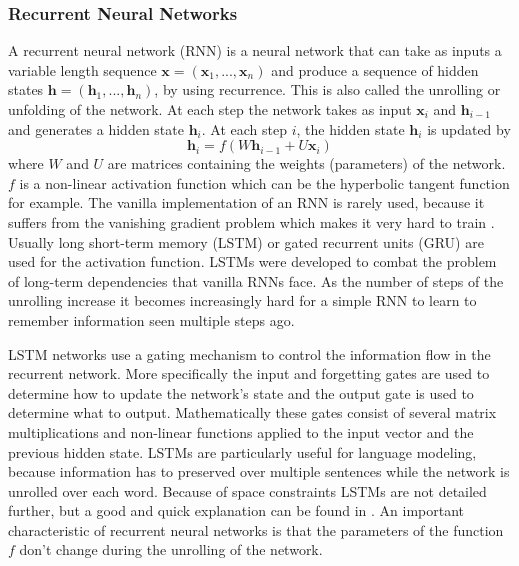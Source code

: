 \documentclass[12pt]{article}
\begin{document}
\subsubsection{Recurrent Neural Networks} \label{sssec:231}
A recurrent neural network (RNN) \cite{RNN:1988} is a neural network that can take as inputs a variable length sequence \(\bm{x}=(\bm{x}_1,...,\bm{x}_n)\) and produce a sequence of hidden states \(\bm{h}=(\bm{h}_1,...,\bm{h}_n)\), by using recurrence. This is also called the unrolling or unfolding of the network. At each step the network takes as input \(\bm{x}_i\) and \(\bm{h}_{i-1}\) and generates a hidden state \(\bm{h}_i\). At each step \(i\), the hidden state \(\bm{h}_i\) is updated by
\begin{equation} \label{eq231a}
\bm{h}_i=f(W\bm{h}_{i-1}+U\bm{x}_i)
\end{equation}
where \(W\) and \(U\) are matrices containing the weights (parameters) of the network. \(f\) is a non-linear activation function which can be the hyperbolic tangent function for example. The vanilla implementation of an RNN is rarely used, because it suffers from the vanishing gradient problem which makes it very hard to train \cite{Hochreiter:1998}. Usually long short-term memory (LSTM) \cite{Hochreiter:1997} or gated recurrent units (GRU) \cite{Cho:2014} are used for the activation function. LSTMs were developed to combat the problem of long-term dependencies that vanilla RNNs face. As the number of steps of the unrolling increase it becomes increasingly hard for a simple RNN to learn to remember information seen multiple steps ago. 

LSTM networks use a gating mechanism to control the information flow in the recurrent network. More specifically the input and forgetting gates are used to determine how to update the network's state and the output gate is used to determine what to output. Mathematically these gates consist of several matrix multiplications and non-linear functions applied to the input vector and the previous hidden state. LSTMs are particularly useful for language modeling, because information has to preserved over multiple sentences while the network is unrolled over each word. Because of space constraints LSTMs are not detailed further, but a good and quick explanation can be found in \cite{LSTM_article}. An important characteristic of recurrent neural networks is that the parameters of the function \(f\) don't change during the unrolling of the network.
\end{document}
